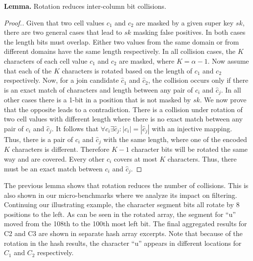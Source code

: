 \textbf{Lemma.} Rotation reduces inter-column bit collisions. 
\begin{proof}[Proof.]
Given that two cell values $c_1$ and $c_2$ are masked by a given super key $sk$, there are two general cases that lead to $sk$ masking false positives. In both cases the length bits must overlap. Either two values from the same domain or from different domains have the same length respectively. In all collision cases, the $K$ characters of each cell value $c_1$ and $c_2$ are masked, where $K = \alpha - 1$. 
Now assume that each of the $K$ characters is rotated based on the length of $c_1$ and $c_2$ respectively. Now, for a join candidate $\hat{c}_1$ and $\hat{c}_2$, the collision occurs only if there is an exact match of characters and length between any pair of $c_i$ and $\hat{c}_j$. In all other cases there is a 1-bit in a position that is not masked by $sk$.
We now prove that the opposite leads to a contradiction.
There is a collision under rotation of two cell values with different length where there is no exact match between any pair of $c_i$ and $\hat{c}_j$. It follows that $\forall c_i \exists \hat{c}_j: |c_i|=|\hat{c}_j|$ with an injective mapping. 
Thus, there is a pair of $c_i$ and $\hat{c}_j$ with the same length, where one of the encoded $K$ characters is different. Therefore $K-1$ character bits will be rotated the same way and are covered. Every other $c_i$ covers at most $K$ characters. Thus, there must be an exact match between $c_i$ and $\hat{c}_j$.
\end{proof}

The previous lemma shows that rotation reduces the number of collisions. This is also shown in our micro-benchmarks where we analyze its impact on filtering.
Continuing our illustrating example, the character segment bits all rotate by $8$ positions to the left.
As can be seen in the rotated array, the segment for ``u'' moved from the 108th to the 100th most left bit.
The final aggregated results for C2 and C3 are shown in separate hash array excerpts.
Note that because of the rotation in the hash results, the character ``u'' appears in different locations for $C_1$ and $C_2$ respectively.

